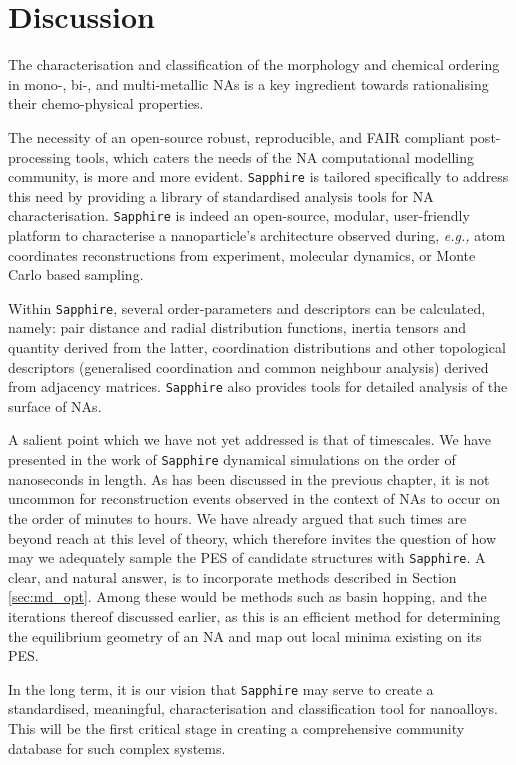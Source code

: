 \section{Discussion}
The characterisation and classification of the morphology and chemical ordering in mono-, bi-, and multi-metallic NAs is a key ingredient towards rationalising their chemo-physical properties.
%

The necessity of an open-source robust, reproducible, and FAIR compliant post-processing tools, which caters the needs of the NA computational modelling community, is more and more evident.
\texttt{Sapphire} is tailored specifically to address this need by providing a library of standardised analysis tools for NA characterisation.
\texttt{Sapphire} is indeed an open-source, modular, user-friendly platform to characterise a nanoparticle's  architecture observed during, \textit{e.g.,} atom coordinates reconstructions from experiment,
molecular dynamics, or Monte Carlo based sampling.

Within \texttt{Sapphire}, several order-parameters and descriptors can be calculated, namely: pair distance and radial distribution functions, 
inertia tensors and quantity derived from the latter, coordination distributions and other topological descriptors (generalised coordination and common neighbour analysis) derived from adjacency matrices. 
\texttt{Sapphire} also provides tools for detailed analysis of the surface of NAs.

 A salient point which we have not yet addressed is that of timescales. We have presented in the work of \texttt{Sapphire} dynamical simulations on the order of nanoseconds in length. As has been discussed in the previous chapter, it is not uncommon for reconstruction events observed in the context of NAs to occur on the order of minutes to hours. We have already argued that such times are beyond reach at this level of theory, which therefore invites the question of how may we adequately sample the PES of candidate structures with \texttt{Sapphire}. A clear, and natural answer, is to incorporate methods described in Section \ref{sec:md_opt}. Among these would be methods such as basin hopping, and the iterations thereof discussed earlier, as this is an efficient method for determining the equilibrium geometry of an NA and map out local minima existing on its PES.

In the long term, it is our vision that \texttt{Sapphire} may serve to create a standardised, meaningful, characterisation and classification tool for nanoalloys. 
This will be the first critical stage in creating a comprehensive community database for such complex systems.
